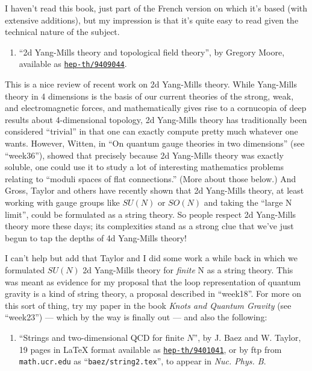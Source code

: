 \documentclass{article}
\def\tightlist{}
\begin{document}
I haven't read this book, just part of the French version on which it's
based (with extensive additions), but my impression is that it's quite
easy to read given the technical nature of the subject.

\begin{enumerate}
\def\labelenumi{\arabic{enumi})}
\setcounter{enumi}{1}
\tightlist
\item
  ``2d Yang-Mills theory and topological field theory'', by Gregory
  Moore, available as
  \href{http://xxx.lanl.gov/abs/hep-th/9409044}{\texttt{hep-th/9409044}}.
\end{enumerate}

This is a nice review of recent work on 2d Yang-Mills theory. While
Yang-Mills theory in 4 dimensions is the basis of our current theories
of the strong, weak, and electromagnetic forces, and mathematically
gives rise to a cornucopia of deep results about 4-dimensional topology,
2d Yang-Mills theory has traditionally been considered ``trivial'' in
that one can exactly compute pretty much whatever one wants. However,
Witten, in ``On quantum gauge theories in two dimensions'' (see
``week36''), showed that precisely because 2d Yang-Mills theory was
exactly soluble, one could use it to study a lot of interesting
mathematics problems relating to ``moduli spaces of flat connections.''
(More about those below.) And Gross, Taylor and others have recently
shown that 2d Yang-Mills theory, at least working with gauge groups like
\(SU(N)\) or \(SO(N)\) and taking the ``large N limit'', could be
formulated as a string theory. So people respect 2d Yang-Mills theory
more these days; its complexities stand as a strong clue that we've just
begun to tap the depths of 4d Yang-Mills theory!

I can't help but add that Taylor and I did some work a while back in
which we formulated \(SU(N)\) 2d Yang-Mills theory for \emph{finite} N
as a string theory. This was meant as evidence for my proposal that the
loop representation of quantum gravity is a kind of string theory, a
proposal described in ``week18''. For more on this sort of thing, try my
paper in the book \emph{Knots and Quantum Gravity} (see ``week23'') ---
which by the way is finally out --- and also the following:

\begin{enumerate}
\def\labelenumi{\arabic{enumi})}
\setcounter{enumi}{2}
\tightlist
\item
  ``Strings and two-dimensional QCD for finite \(N\)'', by J. Baez and
  W. Taylor, 19 pages in LaTeX format available as
  \href{http://xxx.lanl.gov/abs/hep-th/9401041}{\texttt{hep-th/9401041}},
  or by ftp from \texttt{math.ucr.edu} as ``\texttt{baez/string2.tex}'',
  to appear in \emph{Nuc. Phys. B}.
\end{enumerate}
\end{document}
